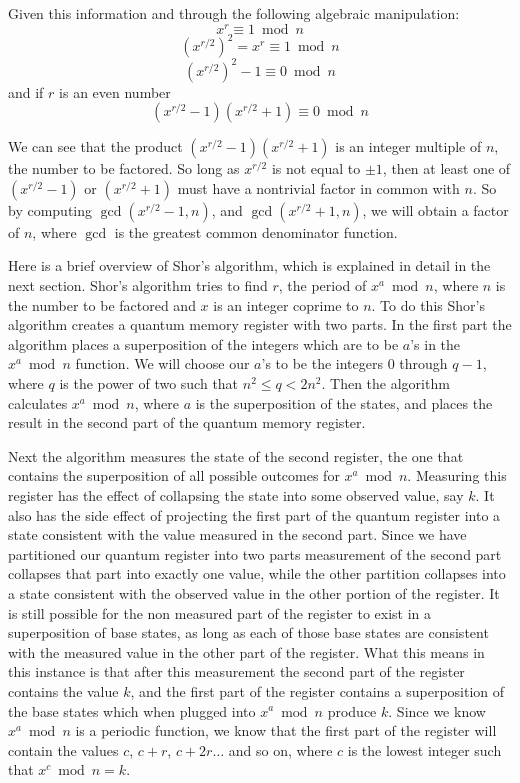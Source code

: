 \documentclass[]{article}
\begin{document}
Given this information and through the following algebraic
manipulation:
	\[x^{r} \equiv 1 \bmod n\]
	\[(x^{r/2})^{2} = x^{r} \equiv 1 \bmod n\]
	\[(x^{r/2})^{2} - 1 \equiv 0 \bmod n\] 
	and if $r$ is an even number
	\[(x^{r/2} - 1)(x^{r/2} + 1) \equiv 0 \bmod n\]

We can see that the product $(x^{r/2} - 1)(x^{r/2} + 1)$ is an integer
multiple of $n$, the number to be factored.  So long as $x^{r/2}$ is
not equal to $\pm 1$, then at least one of $(x^{r/2} - 1)$ or $(x^{r/2} +
1)$ must have a nontrivial factor in common with $n$.  So by computing
$\gcd(x^{r/2} - 1, n)$, and $\gcd(x^{r/2} + 1, n)$, we will obtain a
factor of $n$, where $\gcd$ is the greatest common denominator
function.

Here is a brief overview of Shor's algorithm, which is explained in
detail in the next section. Shor's algorithm tries to find $r$, the
period of $x^{a} \bmod n$, where $n$ is the number to be factored and
$x$ is an integer coprime to $n$. To do this Shor's algorithm creates
a quantum memory register with two parts. In the first part the
algorithm places a superposition of the integers which are to be $a$'s
in the $x^{a} \bmod n$ function. We will choose our $a$'s to be the
integers 0 through $q - 1$, where $q$ is the power of two such that
$n^{2} \leq q < 2n^{2}$. Then the algorithm calculates $x^{a} \bmod
n$, where $a$ is the superposition of the states, and places the
result in the second part of the quantum memory register.

Next the algorithm measures the state of the second register, the one
that contains the superposition of all possible outcomes for $x^{a}
\bmod n$. Measuring this register has the effect of collapsing the
state into some observed value, say $k$. It also has the side effect
of projecting the first part of the quantum register into a state
consistent with the value measured in the second part. Since we have
partitioned our quantum register into two parts measurement of the
second part collapses that part into exactly one value, while the
other partition collapses into a state consistent with the observed
value in the other portion of the register. It is still possible for
the non measured part of the register to exist in a superposition of
base states, as long as each of those base states are consistent with
the measured value in the other part of the register. What this means
in this instance is that after this measurement the second part of the
register contains the value $k$, and the first part of the register
contains a superposition of the base states which when plugged into
$x^{a} \bmod n$ produce $k$. Since we know $x^{a} \bmod n$ is a
periodic function, we know that the first part of the register will
contain the values $c$, $c+r$, $c+2r\ldots$ and so on, where $c$ is
the lowest integer such that $x^{c} \bmod n = k$.
\end{document}
